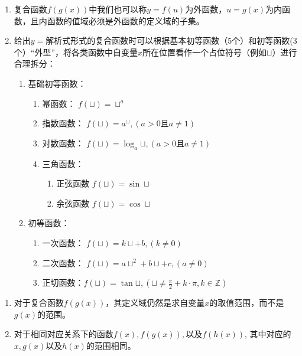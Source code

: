 \begin{note}
    \begin{enumerate}
        \item 复合函数$f(g(x))$中我们也可以称$y=f(u)$为外函数，$u=g(x)$为内函数，且内函数的值域必须是外函数的定义域的子集。
        \item 给出$y=\mbox{解析式}$形式的复合函数时可以根据\textcolor{third}{基本初等函数}（5个）和\textcolor{third}{初等函数}(3个）“外型”，将各类函数中自变量$x$所在位置看作一个占位符号（例如$\sqcup$）进行合理拆分：
        \begin{enumerate}
            \item 基础初等函数：
            \begin{enumerate}
                \item 幂函数： $f(\sqcup) = {\sqcup}^a$
                \item 指数函数： $f(\sqcup) = a^{\sqcup}, (a>0 \mbox{且} a \neq 1)$
                \item 对数函数： $f(\sqcup) = \log_{a}{\sqcup}, (a>0 \mbox{且} a \neq 1)$
                \item 三角函数：
                \begin{enumerate}
                    \item 正弦函数 $f(\sqcup) = \sin{\sqcup}$
                    \item 余弦函数 $f(\sqcup) = \cos{\sqcup}$
                \end{enumerate}
            \end{enumerate}
            \item 初等函数：
            \begin{enumerate}
                \item 一次函数： $f(\sqcup) = k{\sqcup} + b, (k \neq 0)$
                \item \vspace{2mm} 二次函数： $f(\sqcup) = a{\sqcup}^2 + b{\sqcup} + c, (a \neq 0)$ 
                \item \vspace{2mm} 正切函数：$\displaystyle f(\sqcup) = \tan{\sqcup}, ({\sqcup} \neq \frac{\pi}{2} + k \cdot \pi, k \in \mathbb{Z})$
            \end{enumerate}
        \end{enumerate}
    \end{enumerate}
\end{note}

\vspace{3mm}
\begin{note}
\begin{enumerate}
\item 对于复合函数$f(g(x))$，其定义域仍然是求自变量$x$的取值范围，而不是$g(x)$的范围。
\item 对于相同对应关系下的函数$f(x), f(g(x)), \mbox{以及} f(h(x))$, 其中对应的$x, g(x) \mbox{以及} h(x)$的范围相同。
\end{enumerate}
\end{note}

